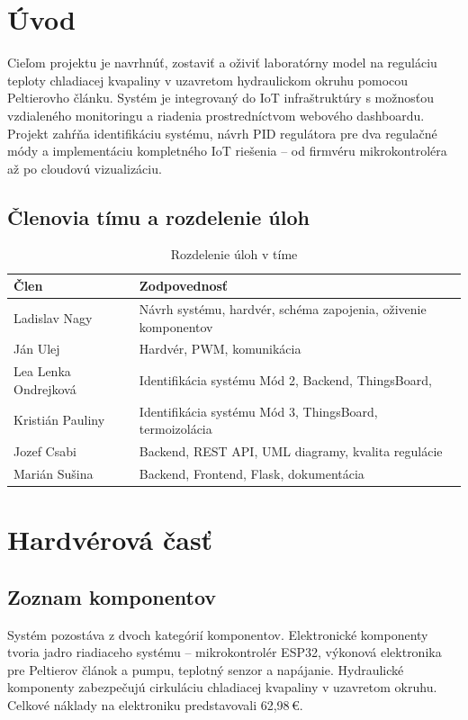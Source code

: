 \section{Úvod}

Cieľom projektu je navrhnúť, zostaviť a oživiť laboratórny model na reguláciu teploty chladiacej kvapaliny v uzavretom hydraulickom okruhu pomocou Peltierovho článku. Systém je integrovaný do IoT infraštruktúry s možnosťou vzdialeného monitoringu a riadenia prostredníctvom webového dashboardu.
Projekt zahŕňa identifikáciu systému, návrh PID regulátora pre dva regulačné módy a implementáciu kompletného IoT riešenia – od firmvéru mikrokontroléra až po cloudovú vizualizáciu.

\subsection{Členovia tímu a rozdelenie úloh}

\begin{table}[H]
\centering
\begin{tabular}{|l|l|}
\hline
\textbf{Člen} & \textbf{Zodpovednosť} \\
\hline
Ladislav Nagy & Návrh systému, hardvér, schéma zapojenia, oživenie komponentov \\
Ján Ulej & Hardvér, PWM, komunikácia \\
Lea Lenka Ondrejková & Identifikácia systému Mód 2, Backend, ThingsBoard,  \\
Kristián Pauliny & Identifikácia systému Mód 3, ThingsBoard, termoizolácia \\
Jozef Csabi & Backend, REST API, UML diagramy, kvalita regulácie \\
Marián Sušina & Backend, Frontend, Flask, dokumentácia \\
\hline
\end{tabular}
\caption{Rozdelenie úloh v tíme}
\end{table}

\section{Hardvérová časť}

\subsection{Zoznam komponentov}

Systém pozostáva z dvoch kategórií komponentov.
Elektronické komponenty tvoria jadro riadiaceho systému -- mikrokontrolér ESP32, výkonová elektronika pre Peltierov článok a pumpu, teplotný senzor a napájanie. Hydraulické komponenty zabezpečujú cirkuláciu chladiacej kvapaliny v uzavretom okruhu. Celkové náklady na elektroniku predstavovali 62,98\,\euro{}.

